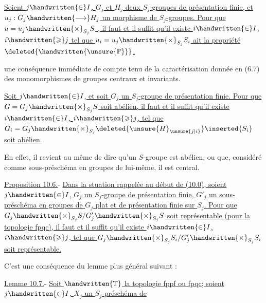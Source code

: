 



 \uline{Soient $j\handwritten{\in}I$, $G_j$ et $H_j$ deux $S_j$-groupes de présentation finie, et $u_j:G_j\handwritten{\longrightarrow}H_j$ un morphisme de $S_j$-groupes. Pour que $u=u_j\handwritten{\times}_{S_j}S$  }\uline{, il faut et il suffit qu'il existe $i\handwritten{\in}I$, $i\handwritten{\geqslant}j$ tel que $u_i=u_j\handwritten{\times}_{S_j}S_i$ ait la propriété $\deleted{\handwritten{\unsure{\mathbb{P}}}}$.}

 une conséquence immédiate de  compte tenu de la caractérisation donnée en (6.7) des monomorphismes de groupes centraux et invariants.

  \uline{Soit $j\handwritten{\in}I$, et soit $G_j$ un $S_j$-groupe de présentation finie. Pour que $G=G_j\handwritten{\times}_{S_j}S$ soit abélien, il faut et il suffit qu'il existe $i\handwritten{\in}I$, $i\handwritten{\geqslant}j$, tel que $G_i=G_j\handwritten{\times}_{S_j}\deleted{\unsure{H}_{\unsure{j|i}}}\inserted{S_i}$ soit abélien.}

En effet, il revient au même de dire qu'un $S$-groupe est abélien, ou que, considéré comme sous-préschéma en groupes de lui-même, il est central.

\uline{Proposition 10.6.}- \uline{Dans la stuation rappelée au début de (10.0), soient $j\handwritten{\in}I$, $G_j$ un $S_j$-groupe de présentation finie, $G'_j$ un sous-préschéma en groupes de $G_j$ plat et de présentation finie sur $S_j$. Pour que $G_j\handwritten{\times}_{S_j}S/G'_j\handwritten{\times}_{S_j}S$ soit représentable (pour la topologie fpqc), il faut et il suffit qu'il existe $i\handwritten{\in}I$, $i\handwritten{\geqslant}j$, tel que $G_j\handwritten{\times}_{S_j}S_i/G'_j\handwritten{\times}_{S_j}S_i$ soit représentable.}

C'est une conséquence du lemme plus général suivant :

\uline{Lemme 10.7.}- \uline{Soit $\handwritten{\mathbb{T}}$ la topologie fppf ou fpqc; soient $j\handwritten{\in}I$, $X_j$ un $S_j$-préschéma de}
